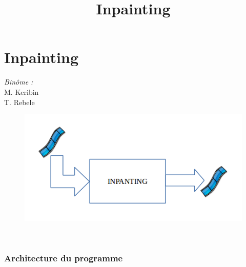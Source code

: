  \section{Inpainting}
 \begin{frame}
 \title{Inpainting}
 \titlepage

    \begin{minipage}{0.3\textwidth}
    \begin{flushleft} \large
    \emph{Binôme :}\\
    M. Keribin\\
    T. Rebele
    \end{flushleft}
    \end{minipage}
    \begin{minipage}{0.5\textwidth}
    \begin{flushright} \large
    \begin{figure}
    \includegraphics[width=1.4\textwidth]{Fig/architectureSectionInpainting.png}
    \end{figure}
    \end{flushright}
    \end{minipage}\\[3cm]
    
 \end{frame}



\begin{frame}
  \frametitle{Architecture du programme}

\end{frame}



